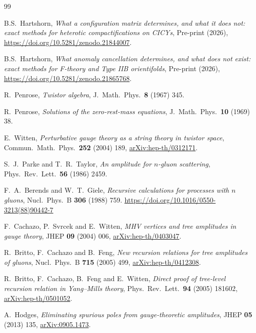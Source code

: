 \documentclass[11pt,a4paper]{article}
\theoremstyle{definition}
\begin{document}
\begin{thebibliography}{99}
\setlength{\itemsep}{1pt plus 0.5pt}

B.S.~Hartshorn,
\emph{What a configuration matrix determines, and what it does not: exact
methods for heterotic compactifications on CICYs},
Pre-print (2026), \url{https://doi.org/10.5281/zenodo.21844007}.

B.S.~Hartshorn,
\emph{What anomaly cancellation determines, and what does not exist: exact
methods for F-theory and Type IIB orientifolds},
Pre-print (2026), \url{https://doi.org/10.5281/zenodo.21865768}.


R.~Penrose,
\emph{Twistor algebra},
J.\ Math.\ Phys.\ \textbf{8} (1967) 345.

R.~Penrose,
\emph{Solutions of the zero-rest-mass equations},
J.\ Math.\ Phys.\ \textbf{10} (1969) 38.

E.~Witten,
\emph{Perturbative gauge theory as a string theory in twistor space},
Commun.\ Math.\ Phys.\ \textbf{252} (2004) 189,
\href{https://arxiv.org/abs/hep-th/0312171}{arXiv:hep-th/0312171}.

S.~J.~Parke and T.~R.~Taylor,
\emph{An amplitude for $n$-gluon scattering},
Phys.\ Rev.\ Lett.\ \textbf{56} (1986) 2459.

F.~A.~Berends and W.~T.~Giele,
\emph{Recursive calculations for processes with $n$ gluons},
Nucl.\ Phys.\ B \textbf{306} (1988) 759. \url{https://doi.org/10.1016/0550-3213(88)90442-7}

F.~Cachazo, P.~Svrcek and E.~Witten,
\emph{MHV vertices and tree amplitudes in gauge theory},
JHEP \textbf{09} (2004) 006,
\href{https://arxiv.org/abs/hep-th/0403047}{arXiv:hep-th/0403047}.

R.~Britto, F.~Cachazo and B.~Feng,
\emph{New recursion relations for tree amplitudes of gluons},
Nucl.\ Phys.\ B \textbf{715} (2005) 499,
\href{https://arxiv.org/abs/hep-th/0412308}{arXiv:hep-th/0412308}.

R.~Britto, F.~Cachazo, B.~Feng and E.~Witten,
\emph{Direct proof of tree-level recursion relation in Yang--Mills theory},
Phys.\ Rev.\ Lett.\ \textbf{94} (2005) 181602,
\href{https://arxiv.org/abs/hep-th/0501052}{arXiv:hep-th/0501052}.

A.~Hodges,
\emph{Eliminating spurious poles from gauge-theoretic amplitudes},
JHEP \textbf{05} (2013) 135,
\href{https://arxiv.org/abs/0905.1473}{arXiv:0905.1473}.



\end{thebibliography}
\end{document}
